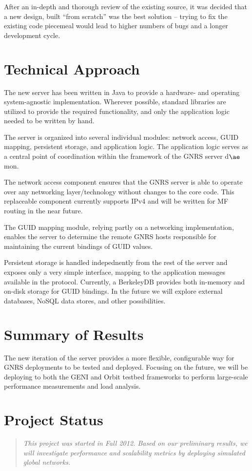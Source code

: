 \documentclass[conference, 11pt]{IEEEtran}
\begin{document}
After an in-depth and thorough review of the existing source, it was decided
that a new design, built ``from scratch'' was the best solution -- trying to
fix the existing code piecemeal would lead to higher numbers of bugs and a
longer development cycle. 
\section{Technical Approach}
The new server has been written in Java to provide a hardware- and operating
system-agnostic implementation.  Wherever possible, standard libraries are
utilized to provide the required functionality, and only the application logic
needed to be written by hand.

The server is organized into several individual modules: network access, GUID
mapping, persistent storage, and application logic.  The application logic
serves as a central point of coordination within the framework of the GNRS
server d$\ae$mon.

The network access component ensures that the GNRS server is able to operate
over any networking layer/technology without changes to the core code.  This
replaceable component currently supports IPv4 and will be written for MF
routing in the near future.

The GUID mapping module, relying partly on a networking implementation,
enables the server to determine the remote GNRS hosts responsible for
maintaining the current bindings of GUID values.

Persistent storage is handled indepednently from the rest of the server and
exposes only a very simple interface, mapping to the application messages
available in the protocol.  Currently, a BerkeleyDB provides both in-memory
and on-disk storage for GUID bindings.  In the future we will explore external
databases, NoSQL data stores, and other possibilities.

\section{Summary of Results}
The new iteration of the server provides a more flexible, configurable way for
GNRS deployments to be tested and deployed. Focusing on the future, we will be
deploying to both the GENI and Orbit testbed frameworks to perform large-scale
performance measurements and load analysis.

\section{Project Status}

\begin{quotation}
\em This project was started in Fall 2012. Based on our preliminary
results, we will investigate performance and scalability metrics by deploying
simulated global networks.
\end{quotation} 


%
\end{document}
